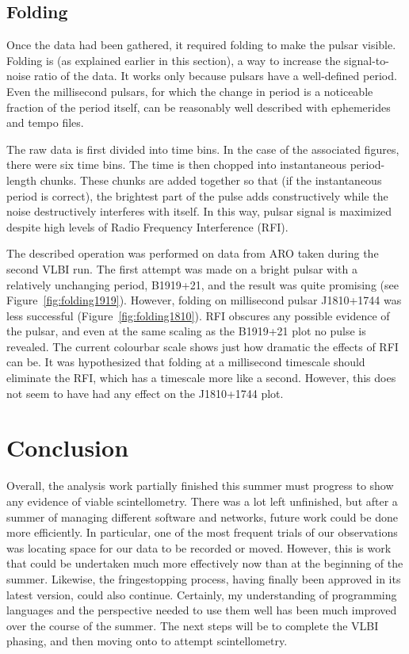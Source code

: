 \documentclass[a4paper,12pt]{article}
\begin{document}
\subsection{Folding}
\label{sec:folding}

Once the data had been gathered, it required folding to make the pulsar visible. Folding is (as explained earlier in this section), a way to increase the signal-to-noise ratio of the data. It works only because pulsars have a well-defined period. Even the millisecond pulsars, for which the change in period is a noticeable fraction of the period itself, can be reasonably well described with ephemerides and tempo files.

The raw data is first divided into time bins. In the case of the associated figures, there were six time bins. The time is then chopped into instantaneous period-length chunks. These chunks are added together so that (if the instantaneous period is correct), the brightest part of the pulse adds constructively while the noise destructively interferes with itself. In this way, pulsar signal is maximized despite high levels of Radio Frequency Interference (RFI).

The described operation was performed on data from ARO taken during the second VLBI run. The first attempt was made on a bright pulsar with a relatively unchanging period, B1919+21, and the result was quite promising (see Figure~\ref{fig:folding1919}). However, folding on millisecond pulsar J1810+1744 was less successful (Figure~\ref{fig:folding1810}). RFI obscures any possible evidence of the pulsar, and even at the same scaling as the B1919+21 plot no pulse is revealed. The current colourbar scale shows just how dramatic the effects of RFI can be. It was hypothesized that folding at a millisecond timescale should eliminate the RFI, which has a timescale more like a second. However, this does not seem to have had any effect on the J1810+1744 plot.

\section{Conclusion}
\label{conclusion} 

Overall, the analysis work partially finished this summer must progress to show any evidence of viable scintellometry. There was a lot left unfinished, but after a summer of managing different software and networks, future work could be done more efficiently. In particular, one of the most frequent trials of our observations was locating space for our data to be recorded or moved. However, this is work that could be undertaken much more effectively now than at the beginning of the summer. Likewise, the fringestopping process, having finally been approved in its latest version, could also continue. Certainly, my understanding of programming languages and the perspective needed to use them well has been much improved over the course of the summer. The next steps will be to complete the VLBI phasing, and then moving onto to attempt scintellometry.




\end{document}
